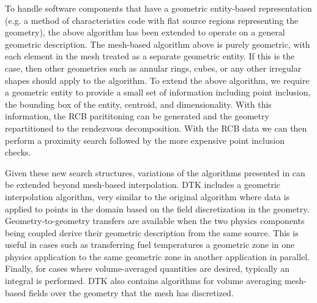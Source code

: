 \documentclass{mc2013}
\begin{document}
\label{subsec:general_geometry}

To handle software components that have a geometric entity-based
representation (e.g. a method of characteristics code with flat source
regions representing the geometry), the above algorithm has been
extended to operate on a general geometric description. The mesh-based
algorithm above is purely geometric, with each element in the mesh
treated as a separate geometric entity. If this is the case, then
other geometries such as annular rings, cubes, or any other irregular
shapes should apply to the algorithm. To extend the above algorithm,
we require a geometric entity to provide a small set of information
including point inclusion, the bounding box of the entity, centroid,
and dimensionality. With this information, the RCB parititoning can be
generated and the geometry repartitioned to the rendezvous
decomposition. With the RCB data we can then perform a proximity
search followed by the more expensive point inclusion checks. 

Given these new search structures, variations of the algorithms
presented in \cite{Plimpton_2004} can be extended beyond mesh-based
interpolation. DTK includes a geometric interpolation algorithm, very
similar to the original algorithm where data is applied to points in
the domain based on the field discretization in the
geometry. Geometry-to-geometry transfers are available when the two
physics components being coupled derive their geometric description
from the same source. This is useful in cases such as transferring
fuel temperatures a geometric zone in one physics application to the
same geometric zone in another application in parallel. Finally, for
cases where volume-averaged quantities are desired, typically an
integral is performed. DTK also contains algorithms for volume
averaging mesh-based fields over the geometry that the mesh has
discretized.

\label{sec:examples}

\label{subsec:cht}

\label{subsec:cfd_neutronics}

\label{sec:scaling_study}
\end{document}
